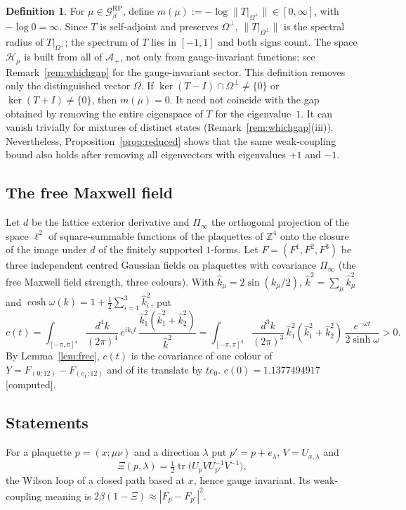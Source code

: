 \documentclass[11pt,a4paper]{article}
\theoremstyle{plain}
\theoremstyle{definition}
\newtheorem{definition}[theorem]{Definition}
\theoremstyle{remark}
\numberwithin{equation}{section}
\newcommand{\Z}{\mathbb{Z}}
\newcommand{\tr}{\operatorname{tr}}
\newcommand{\st}[1]{\textsf{[#1]}}
\newcommand{\cG}{\mathcal{G}}
\newcommand{\cH}{\mathcal{H}}
\begin{document}
\begin{definition}\label{def:gap}
For $\mu\in\cG^{\mathrm{RP}}_\beta$, define
$m(\mu):=-\log\|T|_{\Omega^\perp}\|\in[0,\infty]$, with $-\log0=\infty$.
Since $T$ is self-adjoint and preserves $\Omega^\perp$, $\|T|_{\Omega^\perp}\|$ is the spectral radius of $T|_{\Omega^\perp}$; the
spectrum of $T$ lies in $[-1,1]$ and both signs count.
The space $\cH_\mu$ is built from all of $\mathcal A_+$, not only from gauge-invariant functions; see Remark~\ref{rem:whichgap} for the
gauge-invariant sector.
This definition removes only the distinguished vector $\Omega$.
If $\ker(T-I)\cap\Omega^\perp\ne\{0\}$ or $\ker(T+I)\ne\{0\}$, then $m(\mu)=0$.
It need not coincide with the gap obtained by removing the entire eigenspace of $T$ for the eigenvalue~$1$.
It can vanish trivially for mixtures of distinct states (Remark~\ref{rem:whichgap}(iii)). Nevertheless,
Proposition~\ref{prop:reduced} shows that the same weak-coupling bound also holds after removing all eigenvectors with eigenvalues
$+1$ and $-1$.
\end{definition}

\subsection{The free Maxwell field}
Let $d$ be the lattice exterior derivative and $\Pi_\infty$ the orthogonal projection of the space $\ell^2$ of square-summable
functions of the plaquettes of $\Z^4$ onto the closure of the image under $d$ of the finitely supported $1$-forms. Let $F=(F^1,F^2,F^3)$
be three independent centred Gaussian fields on plaquettes with covariance $\Pi_\infty$ (the free Maxwell field strength, three
colours). With $\hat k_\mu=2\sin(k_\mu/2)$, $\hat k^2=\sum_\mu\hat k_\mu^2$ and $\cosh\omega(k)=1+\frac12\sum_{i=1}^3\hat k_i^2$, put
\begin{equation}\label{eq:c}
c(t)=\int_{[-\pi,\pi]^4}\frac{d^4k}{(2\pi)^4}\,e^{ik_0t}\,\frac{\hat k_1^2(\hat k_1^2+\hat k_2^2)}{\hat k^2}
=\int_{[-\pi,\pi]^3}\frac{d^3k}{(2\pi)^3}\,\hat k_1^2(\hat k_1^2+\hat k_2^2)\,\frac{e^{-\omega t}}{2\sinh\omega}>0 .
\end{equation}
By Lemma~\ref{lem:free}, $c(t)$ is the covariance of one colour of $Y=F_{(0;12)}-F_{(e_1;12)}$ and of its translate by $te_0$.
$c(0)=1.1377494917$ \st{computed}.

\subsection{Statements}
For a plaquette $p=(x;\mu\nu)$ and a direction $\lambda$ put $p'=p+e_\lambda$, $V=U_{x,\lambda}$ and
\begin{equation}\label{eq:Xi}
\Xi(p,\lambda)=\tfrac12\tr\bigl(U_pVU_{p'}^{-1}V^{-1}\bigr),
\end{equation}
the Wilson loop of a closed path based at $x$, hence gauge invariant. Its weak-coupling meaning is $2\beta(1-\Xi)\approx|F_p-F_{p'}|^2$.
\end{document}
